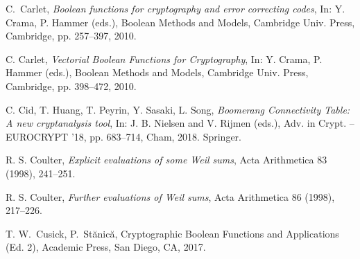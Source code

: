 \documentclass[11pt]{article}
\begin{document}
\begin{thebibliography}{99}
  C.~Carlet, {\em Boolean functions for cryptography and error correcting codes}, In: Y. Crama, P. Hammer  (eds.), Boolean Methods and Models,
Cambridge Univ. Press, Cambridge, pp. 257--397, 2010.

C. Carlet, {\em Vectorial Boolean Functions for Cryptography},
In: Y. Crama, P. Hammer  (eds.), Boolean Methods and Models,
Cambridge Univ. Press, Cambridge, pp. 398--472, 2010.




C. Cid, T. Huang, T. Peyrin, Y. Sasaki, L. Song, {\em Boomerang Connectivity Table:
A new cryptanalysis tool}, In: J. B. Nielsen and V. Rijmen (eds.), 
Adv. in Crypt. -- EUROCRYPT '18, pp. 683--714, Cham, 2018. Springer.

R. S. Coulter, {\em Explicit evaluations of some Weil sums}, Acta Arithmetica 83 (1998), 241--251.

R. S. Coulter, {\em Further evaluations of Weil sums}, Acta Arithmetica 86 (1998), 217--226.

 
 

 T. W.~Cusick, P.~St\u anic\u a,
{Cryptographic Boolean Functions and Applications} (Ed. 2), Academic Press, San Diego, CA,  2017.
 


\end{thebibliography}
\end{document}

